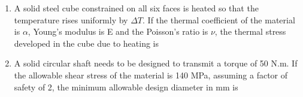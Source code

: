 \documentclass[journal,11pt,onecolumn]{IEEEtran}
\begin{document}
\begin{enumerate}[resume]
          \begin{enumerate}
          \end{enumerate}

    \item A solid steel cube constrained on all six faces is heated so that the temperature rises uniformly by \(\Delta T\). If the thermal coefficient of the material is \(\alpha\), Young's modulus is E and the Poisson's ratio is \(\nu\), the thermal stress developed in the cube due to heating is

          \begin{enumerate}
          \end{enumerate}

    \item A solid circular shaft needs to be designed to transmit a torque of 50 N.m. If the allowable shear stress of the material is 140 MPa, assuming a factor of safety of 2, the minimum allowable design diameter in mm is
          \begin{enumerate}
          \end{enumerate}


\end{enumerate}
\end{document}

